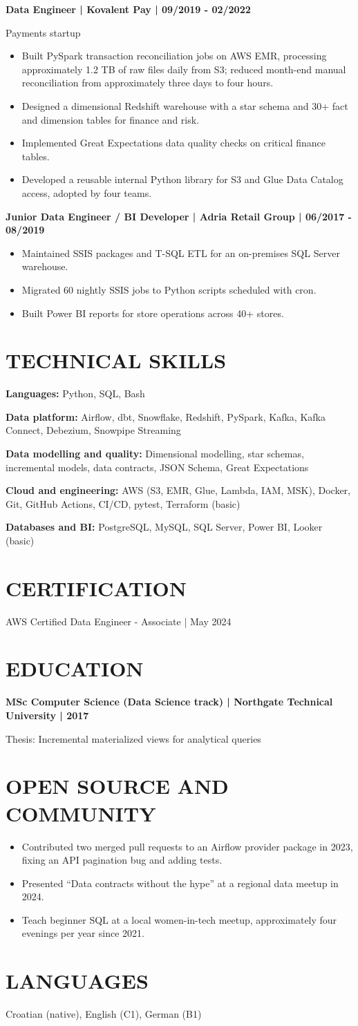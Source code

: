 \documentclass[11pt,a4paper]{article}
\newcommand{\cvsection}[1]{\section*{#1}}
\begin{document}
\newpage
\textbf{Data Engineer | Kovalent Pay | 09/2019 - 02/2022}\par
Payments startup
\begin{itemize}
\item Built PySpark transaction reconciliation jobs on AWS EMR, processing approximately 1.2 TB of raw files daily from S3; reduced month-end manual reconciliation from approximately three days to four hours.
\item Designed a dimensional Redshift warehouse with a star schema and 30+ fact and dimension tables for finance and risk.
\item Implemented Great Expectations data quality checks on critical finance tables.
\item Developed a reusable internal Python library for S3 and Glue Data Catalog access, adopted by four teams.
\end{itemize}
\textbf{Junior Data Engineer / BI Developer | Adria Retail Group | 06/2017 - 08/2019}
\begin{itemize}
\item Maintained SSIS packages and T-SQL ETL for an on-premises SQL Server warehouse.
\item Migrated 60 nightly SSIS jobs to Python scripts scheduled with cron.
\item Built Power BI reports for store operations across 40+ stores.
\end{itemize}
\cvsection{TECHNICAL SKILLS}
\textbf{Languages:} Python, SQL, Bash\par
\textbf{Data platform:} Airflow, dbt, Snowflake, Redshift, PySpark, Kafka, Kafka Connect, Debezium, Snowpipe Streaming\par
\textbf{Data modelling and quality:} Dimensional modelling, star schemas, incremental models, data contracts, JSON Schema, Great Expectations\par
\textbf{Cloud and engineering:} AWS (S3, EMR, Glue, Lambda, IAM, MSK), Docker, Git, GitHub Actions, CI/CD, pytest, Terraform (basic)\par
\textbf{Databases and BI:} PostgreSQL, MySQL, SQL Server, Power BI, Looker (basic)
\cvsection{CERTIFICATION}
AWS Certified Data Engineer - Associate | May 2024
\cvsection{EDUCATION}
\textbf{MSc Computer Science (Data Science track) | Northgate Technical University | 2017}\par
Thesis: Incremental materialized views for analytical queries
\cvsection{OPEN SOURCE AND COMMUNITY}
\begin{itemize}
\item Contributed two merged pull requests to an Airflow provider package in 2023, fixing an API pagination bug and adding tests.
\item Presented ``Data contracts without the hype'' at a regional data meetup in 2024.
\item Teach beginner SQL at a local women-in-tech meetup, approximately four evenings per year since 2021.
\end{itemize}
\cvsection{LANGUAGES}
Croatian (native), English (C1), German (B1)
\end{document}
